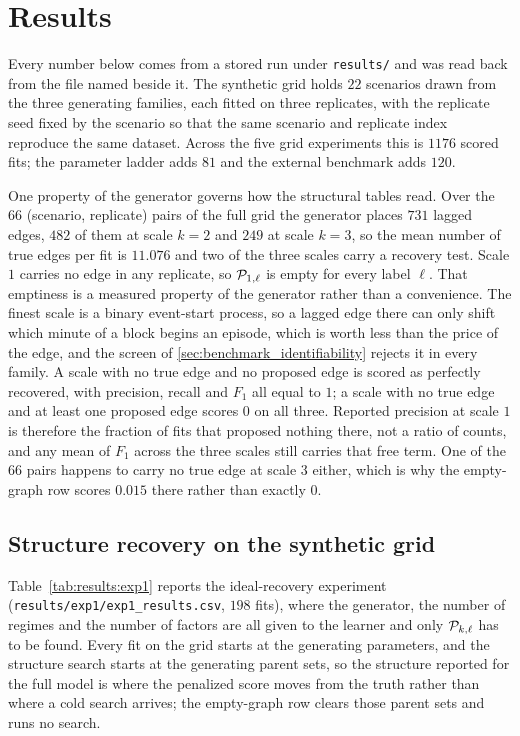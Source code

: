 \section{Results}
\label{sec:results}

Every number below comes from a stored run under \texttt{results/} and was read
back from the file named beside it. The synthetic grid holds $22$ scenarios
drawn from the three generating families, each fitted on three replicates, with
the replicate seed fixed by the scenario so that the same scenario and
replicate index reproduce the same dataset. Across the five grid experiments
this is $1176$ scored fits; the parameter ladder adds $81$ and the external
benchmark adds $120$.

One property of the generator governs how the structural tables read. Over the
$66$ (scenario, replicate) pairs of the full grid the generator places $731$
lagged edges, $482$ of them at scale $k=2$ and $249$ at scale $k=3$, so the
mean number of true edges per fit is $11.076$ and two of the three scales carry
a recovery test. Scale $1$ carries no edge in any replicate, so ${\mathcal{P}}_{1,\ell}$
is empty for every label $\ell$. That emptiness is a measured property of the
generator rather than a convenience. The finest scale is a binary event-start
process, so a lagged edge there can only shift which minute of a block begins
an episode, which is worth less than the price of the edge, and the screen of
\cref{sec:benchmark_identifiability} rejects it in every family. A scale with
no true edge and no proposed edge is scored as perfectly recovered, with
precision, recall and $F_1$ all equal to $1$; a scale with no true edge and at
least one proposed edge scores $0$ on all three. Reported precision at scale
$1$ is therefore the fraction of fits that proposed nothing there, not a ratio
of counts, and any mean of $F_1$ across the three scales still carries that
free term. One of the $66$ pairs happens to carry no true edge at scale $3$
either, which is why the empty-graph row scores $0.015$ there rather than
exactly $0$.

\subsection{Structure recovery on the synthetic grid}
\label{sec:results:structure}

Table~\ref{tab:results:exp1} reports the ideal-recovery experiment
(\texttt{results/exp1/exp1\_results.csv}, $198$ fits), where the generator, the
number of regimes and the number of factors are all given to the learner and
only ${\mathcal{P}}_{k,\ell}$ has to be found. Every fit on the grid
starts at the generating parameters, and the structure search starts at the
generating parent sets, so the structure reported for the full model is where
the penalized score moves from the truth rather than where a cold search
arrives; the empty-graph row clears those parent sets and runs no search.

